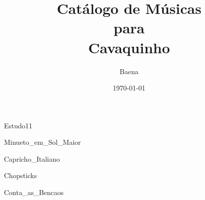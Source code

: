 \documentclass{scrartcl}
\begin{document}
\title{\textbf{\Huge Catálogo de Músicas\\ \vspace{1cm} para\\ \vspace{1cm} Cavaquinho}}
\author{Baena}
\date{\today}
\maketitle
\thispagestyle{empty}
\newpage

\setcounter{page}{1}

\begin{multicols}{2}
\tableofcontents
\end{multicols}

\cleardoublepage
{}
\setcounter{page}{1}









{Estudo11}


{Minueto_em_Sol_Maior}








{Capricho_Italiano}


{Chopsticks}


{Conta_as_Bencaos}
\end{document}
